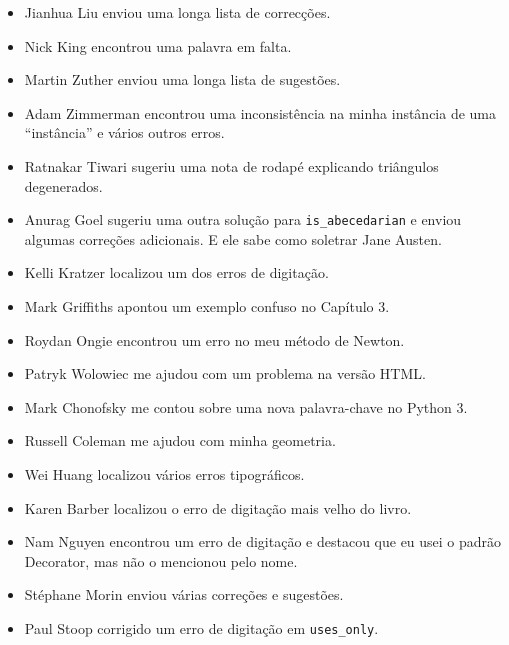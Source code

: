 \documentclass[10pt]{book}
\begin{document}
\begin {itemize}
\item Jianhua Liu enviou uma longa lista de correcções.

\item Nick King encontrou uma palavra em falta.

\item Martin Zuther enviou uma longa lista de sugestões.

\item Adam Zimmerman encontrou uma inconsistência na minha instância
de uma ``instância'' e vários outros erros.

\item Ratnakar Tiwari sugeriu uma nota de rodapé explicando triângulos
degenerados.

\item Anurag Goel sugeriu uma outra solução para \verb"is_abecedarian"
e enviou algumas correções adicionais. E ele sabe como
soletrar Jane Austen.

\item Kelli Kratzer localizou um dos erros de digitação.

\item Mark Griffiths apontou um exemplo confuso no Capítulo 3.

\item Roydan Ongie encontrou um erro no meu método de Newton.

\item Patryk Wolowiec me ajudou com um problema na versão HTML.

\item Mark Chonofsky me contou sobre uma nova palavra-chave no Python 3.

\item Russell Coleman me ajudou com minha geometria.

\item Wei Huang localizou vários erros tipográficos.

\item Karen Barber localizou o erro de digitação mais velho do livro.

\item Nam Nguyen encontrou um erro de digitação e destacou que eu usei o padrão
Decorator, mas não o mencionou pelo nome.

\item St\'{e}phane Morin enviou várias correções e sugestões.

\item Paul Stoop corrigido um erro de digitação em \verb+uses_only+.


\end{itemize}
\end{document}

